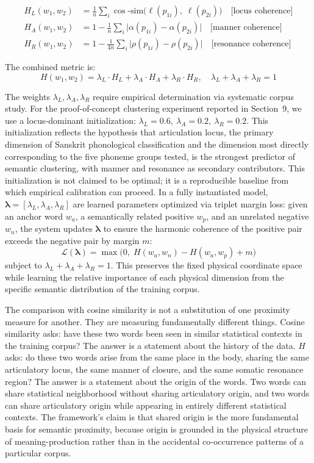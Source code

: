 \documentclass[12pt]{article}
\begin{document}
\begin{align}
H_L(w_1, w_2) &= \frac{1}{n}\sum_i \cos\text{-sim}\bigl(\ell(p_{1i}),\; \ell(p_{2i})\bigr) \quad\text{[locus coherence]} \\[4pt]
H_A(w_1, w_2) &= 1 - \frac{1}{n}\sum_i \bigl|\alpha(p_{1i}) - \alpha(p_{2i})\bigr| \quad\text{[manner coherence]} \\[4pt]
H_R(w_1, w_2) &= 1 - \frac{1}{4n}\sum_i \bigl|\rho(p_{1i}) - \rho(p_{2i})\bigr| \quad\text{[resonance coherence]}
\end{align}

The combined metric is:
\[
H(w_1, w_2) = \lambda_L \cdot H_L + \lambda_A \cdot H_A + \lambda_R \cdot H_R, \quad \lambda_L + \lambda_A + \lambda_R = 1
\]

The weights $\lambda_L, \lambda_A, \lambda_R$ require empirical determination via systematic corpus study. For the proof-of-concept clustering experiment reported in Section~9, we use a locus-dominant initialization: $\lambda_L = 0.6,\ \lambda_A = 0.2,\ \lambda_R = 0.2$. This initialization reflects the hypothesis that articulation locus, the primary dimension of Sanskrit phonological classification and the dimension most directly corresponding to the five phoneme groups tested, is the strongest predictor of semantic clustering, with manner and resonance as secondary contributors. This initialization is not claimed to be optimal; it is a reproducible baseline from which empirical calibration can proceed. In a fully instantiated model, $\boldsymbol{\lambda} = [\lambda_L, \lambda_A, \lambda_R]$ are learned parameters optimized via triplet margin loss: given an anchor word $w_a$, a semantically related positive $w_p$, and an unrelated negative $w_n$, the system updates $\boldsymbol{\lambda}$ to ensure the harmonic coherence of the positive pair exceeds the negative pair by margin $m$:
\[
\mathcal{L}(\boldsymbol{\lambda}) = \max\bigl(0,\; H(w_a, w_n) - H(w_a, w_p) + m\bigr)
\]
subject to $\lambda_L + \lambda_A + \lambda_R = 1$. This preserves the fixed physical coordinate space while learning the relative importance of each physical dimension from the specific semantic distribution of the training corpus.

The comparison with cosine similarity is not a substitution of one proximity measure for another. They are measuring fundamentally different things. Cosine similarity asks: have these two words been seen in similar statistical contexts in the training corpus? The answer is a statement about the history of the data. $H$ asks: do these two words arise from the same place in the body, sharing the same articulatory locus, the same manner of closure, and the same somatic resonance region? The answer is a statement about the origin of the words. Two words can share statistical neighborhood without sharing articulatory origin, and two words can share articulatory origin while appearing in entirely different statistical contexts. The framework's claim is that shared origin is the more fundamental basis for semantic proximity, because origin is grounded in the physical structure of meaning-production rather than in the accidental co-occurrence patterns of a particular corpus.
\end{document}

